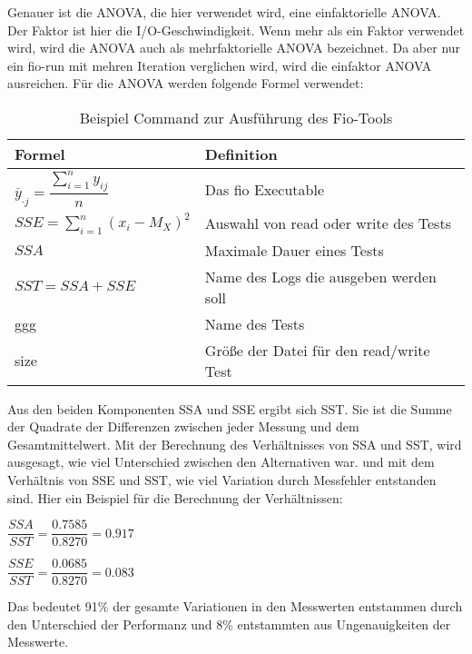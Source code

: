 Genauer ist die ANOVA, die hier verwendet wird, eine einfaktorielle ANOVA.
Der Faktor ist hier die I/O-Geschwindigkeit. Wenn mehr als ein Faktor verwendet wird, wird die ANOVA auch als mehrfaktorielle ANOVA bezeichnet.
Da aber nur ein fio-run mit mehren Iteration verglichen wird, wird die einfaktor ANOVA ausreichen.
Für die ANOVA werden folgende Formel verwendet:

\begin{center}
  \begin{table}[h!]
    \begin{tabularx}{\textwidth}{|X|X|}
      \hline
        Formel & Definition \\ 
      \hline
      $\overline{y}_{\cdot j} = \dfrac{\sum_{i=1}^{n} y_{ij}}{n}$ & Das fio Executable  \\ 
      $SSE =  \sum_{i=1}^{n} (x_i - M_X)^2$ & Auswahl von read oder write des Tests  \\ 
      \hline
      $SSA$ & Maximale Dauer eines Tests  \\ 
      \hline
      $SST = SSA + SSE$ &  Name des Logs die ausgeben werden soll   \\ 
      \hline
      ggg &  Name des Tests   \\ 
      \hline
      size & Größe der Datei für den read/write Test    \\ 
      \hline
    \end{tabularx}
    \caption{Beispiel Command zur Ausführung des Fio-Tools}
    \label{tab:formel_mittelwerte}
  \end{table}
\end{center}

Aus den beiden Komponenten SSA und SSE ergibt sich SST.
Sie ist die Summe der Quadrate der Differenzen zwischen jeder Messung und dem Gesamtmittelwert.
Mit der Berechnung des Verhältnisses von SSA und SST, wird ausgesagt, wie viel Unterschied zwischen den Alternativen war.
und mit dem Verhältnis von SSE und SST, wie viel Variation durch Messfehler entstanden sind.  
Hier ein Beispiel für die Berechnung der Verhältnissen:

\begin{center}
  $\dfrac{SSA}{SST} = \dfrac{0.7585}{0.8270} = 0.917$
\end{center}

\begin{center}
  $\dfrac{SSE}{SST} = \dfrac{0.0685}{0.8270} = 0.083$
\end{center}

Das bedeutet 91\% der gesamte Variationen in den Messwerten entstammen durch den Unterschied der Performanz und
8\% entstammten aus Ungenauigkeiten der Messwerte. 



